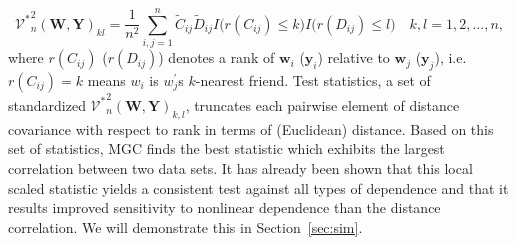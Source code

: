 \documentclass[12pt]{article}
\theoremstyle{definition}
\begin{document}
\begin{equation}
\label{eq:MGC}
{\mathcal{V}^{*}}^2_{n} (\mathbf{W}, \mathbf{Y})_{kl} = \frac{1}{n^2} \sum\limits_{i,j=1}^{n} \tilde{C}_{ij} \tilde{D}_{ij} I \big( r(C_{ij}) \leq k \big) I \big( r(D_{ij}) \leq l  \big) \quad k,l=1,2,..., n ,
\end{equation}
where $r(C_{ij})$ ($r(D_{ij})$) denotes a rank of $\mathbf{w}_{i}$ ($\mathbf{y}_{i}$) relative to $\mathbf{w}_{j}$ ($\mathbf{y}_{j}$), i.e. $r(C_{ij}) = k$ means $w_{i}$ is $w^{'}_{j}$s $k$-nearest friend. Test statistics, a set of standardized ${\mathcal{V}^{*}}^2_{n} (\mathbf{W}, \mathbf{Y})_{k,l}$, truncates each pairwise element of distance covariance with respect to rank in terms of (Euclidean) distance. Based on this set of statistics, MGC finds the best statistic which exhibits the largest correlation between two data sets. It has already been shown that this local scaled statistic yields a consistent test against all types of dependence and that it results improved sensitivity to nonlinear dependence than the distance correlation. We will demonstrate this in Section~\ref{sec:sim}.
\end{document}
